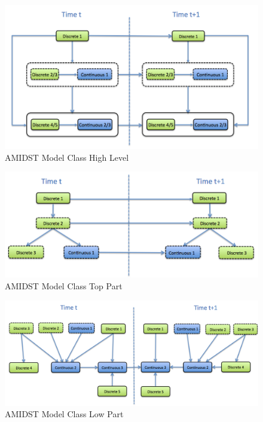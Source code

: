 \begin{figure}
\begin{center}
\includegraphics[scale=0.4]{./figures/AMIDSTModelClassHighLevel}
\caption{\label{Figure:AMIDSTModelClassHighLevel} AMIDST Model Class High Level}
\end{center}
\end{figure}



\begin{figure}
\begin{center}
\includegraphics[scale=0.4]{./figures/AMIDSTModelClassTopPart}
\caption{\label{Figure:AMIDSTModelClassHighLevel} AMIDST Model Class Top Part}
\end{center}
\end{figure}

\begin{figure}
\begin{center}
\includegraphics[scale=0.4]{./figures/AMIDSTModelClassLowPart}
\caption{\label{Figure:AMIDSTModelClassHighLevel} AMIDST Model Class Low Part}
\end{center}
\end{figure}